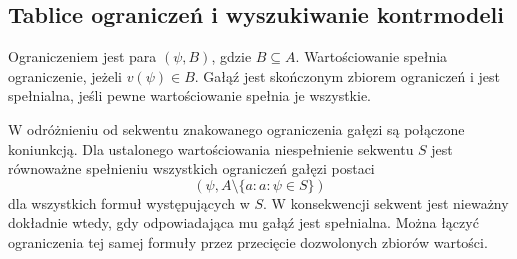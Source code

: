\subsection{Tablice ograniczeń i wyszukiwanie kontrmodeli}
\begin{definicja}
\label{def:ncl-matrix-constraints}
Ograniczeniem jest para $(\psi,B)$, gdzie
$B\subseteq A$. Wartościowanie spełnia ograniczenie,
jeżeli $v(\psi)\in B$. Gałąź jest skończonym
zbiorem ograniczeń i jest spełnialna, jeśli pewne
wartościowanie spełnia je wszystkie.
\end{definicja}
W odróżnieniu od sekwentu znakowanego ograniczenia
gałęzi są połączone koniunkcją. Dla ustalonego wartościowania niespełnienie
sekwentu $S$ jest równoważne spełnieniu wszystkich
ograniczeń gałęzi postaci
\[
 (\psi,A\setminus\{a:a:\psi\in S\})
\]
dla wszystkich formuł występujących w $S$.
W konsekwencji sekwent jest nieważny dokładnie wtedy,
gdy odpowiadająca mu gałąź jest spełnialna.
Można łączyć ograniczenia tej samej formuły
przez przecięcie dozwolonych zbiorów wartości.

